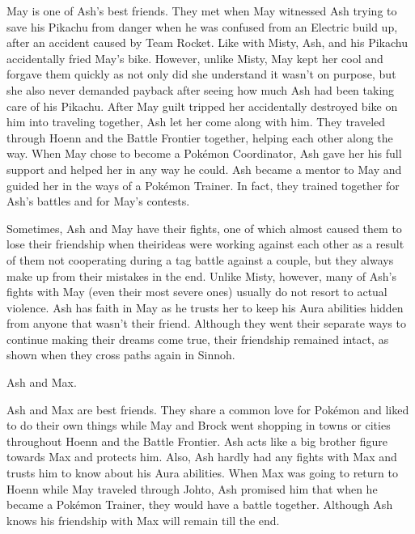 \documentclass[a4paper,12pt]{article}
\begin{document}
May is one of Ash's best friends. They met when May witnessed Ash trying to save his Pikachu from danger when he was confused from an Electric build up, after an accident caused by Team Rocket. Like with Misty, Ash, and his Pikachu accidentally fried May's bike. However, unlike Misty, May kept her cool and forgave them quickly as not only did she understand it wasn't on purpose, but she also never demanded payback after seeing how much Ash had been taking care of his Pikachu. After May guilt tripped her accidentally destroyed bike on him into traveling together, Ash let her come along with him. They traveled through Hoenn and the Battle Frontier together, helping each other along the way. When May chose to become a Pokémon Coordinator, Ash gave her his full support and helped her in any way he could. Ash became a mentor to May and guided her in the ways of a Pokémon Trainer. In fact, they trained together for Ash's battles and for May's contests.\\ \par \vspace{0.5cm}

Sometimes, Ash and May have their fights, one of which almost caused them to lose their friendship when theirideas were working against each other as a result of them not cooperating during a tag battle against a couple, but they always make up from their mistakes in the end. Unlike Misty, however, many of Ash's fights with May (even their most severe ones) usually do not resort to actual violence. Ash has faith in May as he trusts her to keep his Aura abilities hidden from anyone that wasn't their friend. Although they went their separate ways to continue making their dreams come true, their friendship remained intact, as shown when they cross paths again in Sinnoh.\\ \par \vspace{0.5cm}

Ash and Max.\\ \par \vspace{0.5cm}

Ash and Max are best friends. They share a common love for Pokémon and liked to do their own things while May and Brock went shopping in towns or cities throughout Hoenn and the Battle Frontier. Ash acts like a big brother figure towards Max and protects him. Also, Ash hardly had any fights with Max and trusts him to know about his Aura abilities. When Max was going to return to Hoenn while May traveled through Johto, Ash promised him that when he became a Pokémon Trainer, they would have a battle together. Although Ash knows his friendship with Max will remain till the end.\\ \par \vspace{0.5cm}
\end{document}
